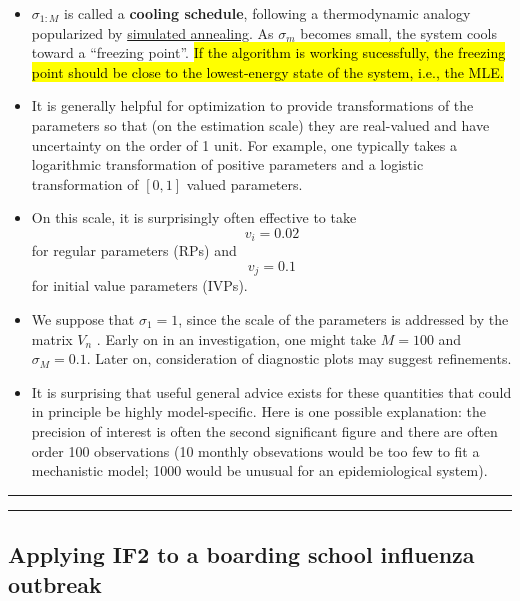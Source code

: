 \documentclass[]{article}
\begin{document}
\begin{itemize}
\[\begin{array}{ll}
  0 & \mbox{if $n\neq q$} \end{array}\right.\]
\item
  \(\sigma_{1:M}\) is called a \textbf{cooling schedule}, following a
  thermodynamic analogy popularized by
  \href{https://en.wikipedia.org/wiki/Simulated_annealing}{simulated
  annealing}. As \(\sigma_m\) becomes small, the system cools toward a
  ``freezing point''. \hl{If the algorithm is working sucessfully, the
  freezing point should be close to the lowest-energy state of the
  system, i.e., the MLE.}
\item
  It is generally helpful for optimization to provide transformations of
  the parameters so that (on the estimation scale) they are real-valued
  and have uncertainty on the order of 1 unit. For example, one
  typically takes a logarithmic transformation of positive parameters
  and a logistic transformation of \([0,1]\) valued parameters.
\item
  On this scale, it is surprisingly often effective to take
  \[ v_i = 0.02\] for regular parameters (RPs) and \[ v_j = 0.1\] for
  initial value parameters (IVPs).
\item
  We suppose that \(\sigma_1=1\), since the scale of the parameters is
  addressed by the matrix \(V_n\) . Early on in an investigation, one
  might take \(M=100\) and \(\sigma_M=0.1\). Later on, consideration of
  diagnostic plots may suggest refinements.
\item
  It is surprising that useful general advice exists for these
  quantities that could in principle be highly model-specific. Here is
  one possible explanation: the precision of interest is often the
  second significant figure and there are often order 100 observations
  (10 monthly obsevations would be too few to fit a mechanistic model;
  1000 would be unusual for an epidemiological system).
\end{itemize}

\begin{center}\rule{0.5\linewidth}{\linethickness}\end{center}

\begin{center}\rule{0.5\linewidth}{\linethickness}\end{center}

\subsection{Applying IF2 to a boarding school influenza
outbreak}\label{applying-if2-to-a-boarding-school-influenza-outbreak}
\end{document}

